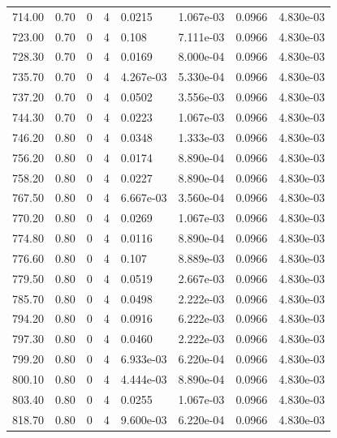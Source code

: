 \documentclass[preview]{standalone}
\begin{document}
{{{{{\begin{tabular}{L{1.2cm}C{1.2cm} C{0.3cm}C{0.5cm} C{1.4cm}C{1.4cm} C{1.4cm}C{1.4cm}}
  714.00  &  0.70  & 0     &  4 &  0.0215  & 1.067e-03  & 0.0966 &  4.830e-03   \\ 
  723.00  &  0.70  & 0     &  4 &  0.108  & 7.111e-03  & 0.0966 &  4.830e-03   \\ 
  728.30  &  0.70  & 0     &  4 &  0.0169  & 8.000e-04  & 0.0966 &  4.830e-03   \\ 
  735.70  &  0.70  & 0     &  4 &  4.267e-03  & 5.330e-04  & 0.0966 &  4.830e-03   \\ 
  737.20  &  0.70  & 0     &  4 &  0.0502  & 3.556e-03  & 0.0966 &  4.830e-03   \\ 
  744.30  &  0.70  & 0     &  4 &  0.0223  & 1.067e-03  & 0.0966 &  4.830e-03   \\ 
  746.20  &  0.80  & 0     &  4 &  0.0348  & 1.333e-03  & 0.0966 &  4.830e-03   \\ 
  756.20  &  0.80  & 0     &  4 &  0.0174  & 8.890e-04  & 0.0966 &  4.830e-03   \\ 
  758.20  &  0.80  & 0     &  4 &  0.0227  & 8.890e-04  & 0.0966 &  4.830e-03   \\ 
  767.50  &  0.80  & 0     &  4 &  6.667e-03  & 3.560e-04  & 0.0966 &  4.830e-03   \\ 
  770.20  &  0.80  & 0     &  4 &  0.0269  & 1.067e-03  & 0.0966 &  4.830e-03   \\ 
  774.80  &  0.80  & 0     &  4 &  0.0116  & 8.890e-04  & 0.0966 &  4.830e-03   \\ 
  776.60  &  0.80  & 0     &  4 &  0.107  & 8.889e-03  & 0.0966 &  4.830e-03   \\ 
  779.50  &  0.80  & 0     &  4 &  0.0519  & 2.667e-03  & 0.0966 &  4.830e-03   \\ 
  785.70  &  0.80  & 0     &  4 &  0.0498  & 2.222e-03  & 0.0966 &  4.830e-03   \\ 
  794.20  &  0.80  & 0     &  4 &  0.0916  & 6.222e-03  & 0.0966 &  4.830e-03   \\ 
  797.30  &  0.80  & 0     &  4 &  0.0460  & 2.222e-03  & 0.0966 &  4.830e-03   \\ 
  799.20  &  0.80  & 0     &  4 &  6.933e-03  & 6.220e-04  & 0.0966 &  4.830e-03   \\ 
  800.10  &  0.80  & 0     &  4 &  4.444e-03  & 8.890e-04  & 0.0966 &  4.830e-03   \\ 
  803.40  &  0.80  & 0     &  4 &  0.0255  & 1.067e-03  & 0.0966 &  4.830e-03   \\ 
  818.70  &  0.80  & 0     &  4 &  9.600e-03  & 6.220e-04  & 0.0966 &  4.830e-03   \\ 

\end{tabular}}}}}}
\end{document}
